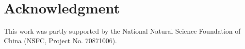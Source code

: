 \documentclass{elsarticle}
\begin{document}
\section*{Acknowledgment}
\label{sec:acknowledgment}
This work was partly supported by the National Natural Science Foundation of China (NSFC, Project No. 70871006).




\end{document}
